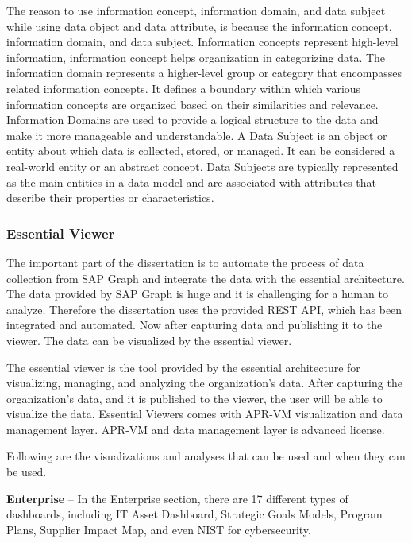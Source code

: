 \documentclass{article}
\begin{document}
The reason to use information concept, information domain, and data subject while using data object and data attribute, is because the information concept, information domain, and data subject. Information concepts represent high-level information, information concept helps organization in categorizing data. The information domain represents a higher-level group or category that encompasses related information concepts. It defines a boundary within which various information concepts are organized based on their similarities and relevance. Information Domains are used to provide a logical structure to the data and make it more manageable and understandable. A Data Subject is an object or entity about which data is collected, stored, or managed. It can be considered a real-world entity or an abstract concept. Data Subjects are typically represented as the main entities in a data model and are associated with attributes that describe their properties or characteristics.

\clearpage
\maketitle
\subsubsection{Essential Viewer}

The important part of the dissertation is to automate the process of data collection from SAP Graph and integrate the data with the essential architecture. The data provided by SAP Graph is huge and it is challenging for a human to analyze. Therefore the dissertation uses the provided REST API, which has been integrated and automated. Now after capturing data and publishing it to the viewer. The data can be visualized by the essential viewer.

The essential viewer is the tool provided by the essential architecture for visualizing, managing, and analyzing the organization's data. After capturing the organization's data, and it is published to the viewer, the user will be able to visualize the data. Essential Viewers comes with APR-VM visualization and data management layer. APR-VM and data management layer is advanced license.

Following are the visualizations and analyses that can be used and when they can be used.

\textbf{Enterprise} – In the Enterprise section, there are 17 different types of dashboards, including IT Asset Dashboard, Strategic Goals Models, Program Plans, Supplier Impact Map, and even NIST for cybersecurity.
\end{document}
